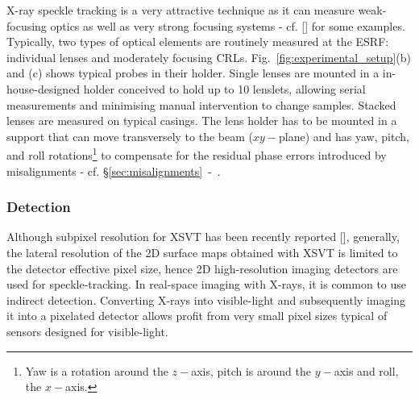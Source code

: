 \begin{refsection}
X-ray speckle tracking is a very attractive technique as it can measure weak-focusing optics as well as very strong focusing systems - cf. [\cite{Berujon2020a}] for some examples. Typically, two types of optical elements are routinely measured at the ESRF: individual lenses and moderately focusing CRLs. Fig.~\ref{fig:experimental_setup}(b) and (c) shows typical probes in their holder. Single lenses are mounted in a in-house-designed holder conceived to hold up to 10 lenslets, allowing serial measurements and minimising manual intervention to change samples. Stacked lenses are measured on typical casings. The lens holder has to be mounted in a support that can move transversely to the beam ($xy-$plane) and has yaw, pitch, and roll rotations\footnote{Yaw is a rotation around the $z-$axis, pitch is around the $y-$axis and roll, the $x-$axis.} to compensate for the residual phase errors introduced by misalignments - cf. \S\ref{sec:misalignments}~-~\textit{}. 

\subsubsection*{Detection}

Although subpixel resolution for XSVT has been recently reported [\cite{Qiao2020b}], generally, the lateral resolution of the 2D surface maps obtained with XSVT is limited to the detector effective pixel size, hence 2D high-resolution imaging detectors are used for speckle-tracking. In real-space imaging with X-rays, it is common to use indirect detection. Converting X-rays into visible-light and subsequently imaging it into a pixelated detector allows profit from very small pixel sizes typical of sensors designed for visible-light.


\end{refsection}
